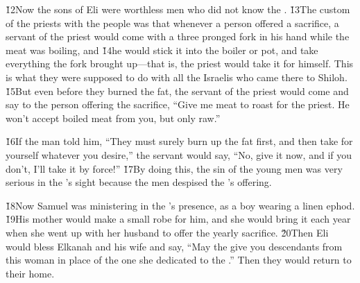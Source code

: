 \v{12}Now the sons of Eli were worthless men who did not know the . \v{13}The custom of the priests with the people was that whenever a person offered a sacrifice, a servant of the priest would come with a three pronged fork in his hand while the meat was boiling, and \v{14}he would stick it into the boiler or pot, and take everything the fork brought up---that is, the priest would take it for himself. This is what they were supposed to do with all the Israelis who came there to Shiloh. \v{15}But even before they burned the fat, the servant of the priest would come and say to the person offering the sacrifice, ``Give me meat to roast for the priest. He won't accept boiled meat from you, but only raw.''

\v{16}If the man told him, ``They must surely burn up the fat first, and then take for yourself whatever you desire,'' the servant would say, ``No, give it now, and if you don't, I'll take it by force!'' \v{17}By doing this, the sin of the young men was very serious in the 's sight because the men despised the 's offering.

\v{18}Now Samuel was ministering in the 's presence, as a boy wearing a linen ephod. \v{19}His mother would make a small robe for him, and she would bring it each year when she went up with her husband to offer the yearly sacrifice. \v{20}Then Eli would bless Elkanah and his wife and say, ``May the  give you descendants from this woman in place of the one she dedicated to the .'' Then they would return to their home.

